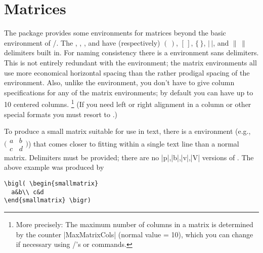 \documentclass[leqno,titlepage,openany]{amsldoc}
\begin{document}
\section{Matrices}\label{ss:matrix}

The  package provides some environments for
matrices beyond the basic  environment of
\latex/. The , , ,  and
 have (respectively) $(\,)$, $[\,]$, $\lbrace\,\rbrace$,
$\lvert\,\rvert$, and
$\lVert\,\rVert$ delimiters built in. For naming consistency there is a
 environment sans delimiters. This is not entirely redundant
with the  environment; the matrix environments all use more
economical horizontal spacing than the rather prodigal spacing of the
 environment. Also, unlike the  environment, you
don't have to give column specifications for any of the matrix
environments; by default you can have up to 10 centered columns.%
\footnote{%
More precisely: The maximum number of columns in a matrix is determined
by the counter |MaxMatrixCols| (normal value = 10), which you can change
if necessary using \latex/'s  or 
commands.%
}\space%
(If you need left or right alignment in a column or other special
formats you must resort to .)

To produce a small matrix suitable for use in text, there is a
 environment (e.g.,
\begin{math}
\bigl( \begin{smallmatrix}
  a&b\\ c&d
\end{smallmatrix} \bigr)
\end{math})
that comes closer to fitting within a single text line than a normal
matrix. Delimiters must be provided; there are no |p|,|b|,|v|,|V|
versions of . The above example was produced by
\begin{verbatim}
\bigl( \begin{smallmatrix}
  a&b\\ c&d
\end{smallmatrix} \bigr)
\end{verbatim}
\end{document}
